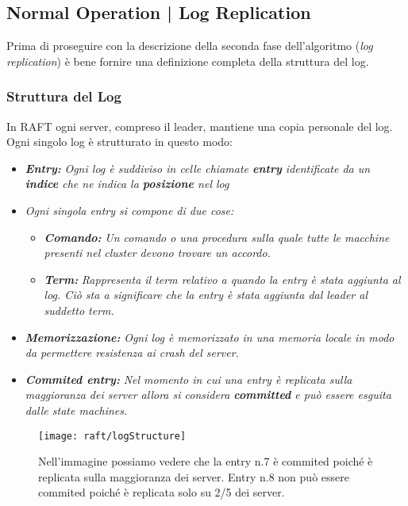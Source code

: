 \subsection{Normal Operation | Log Replication}
\label{Log Replication}
Prima di proseguire con la descrizione della seconda fase dell'algoritmo (\textit{log replication}) è bene fornire una definizione completa della struttura del log.
  \subsubsection{Struttura del Log}
  In RAFT ogni server, compreso il leader, mantiene una copia personale del log.\\ Ogni singolo log è strutturato in questo modo:
  \begin{itemize}
    \item{\emph{\textbf{Entry:}}}
    \emph{Ogni log è suddiviso in celle chiamate \textbf{entry} identificate da un \textbf{indice} che ne indica la \textbf{posizione} nel log}
    \item{\emph{Ogni singola entry si compone di due cose:}}
      \begin{itemize}
        \item{\emph{\textbf{Comando:}}}
        \emph{Un comando o una procedura sulla quale tutte le macchine presenti nel cluster devono trovare un accordo.}
        \item{\emph{\textbf{Term:}}}
        \emph{Rappresenta il term relativo a quando la entry è stata aggiunta al log. Ciò sta a significare che la entry è stata aggiunta dal leader al suddetto term.}
      \end{itemize}
    \item{\emph{\textbf{Memorizzazione:}}}
    \emph{Ogni log è memorizzato in una memoria locale in modo da permettere resistenza ai crash del server.}
    \item{\emph{\textbf{Commited entry:}}}
    \emph{Nel momento in cui una entry è replicata sulla maggioranza dei server allora si considera \textbf{committed} e può essere esguita dalle state machines.}
  \end{itemize}
  \begin{figure}[H]
  	\centering
  	\texttt{[image: raft/logStructure]}
  	\caption{Nell'immagine possiamo vedere che la entry n.7 è commited poiché è replicata sulla maggioranza dei server. Entry n.8 non può essere commited poiché è replicata solo su 2/5 dei server.}
  	\label{fig:figure6}
  \end{figure}

